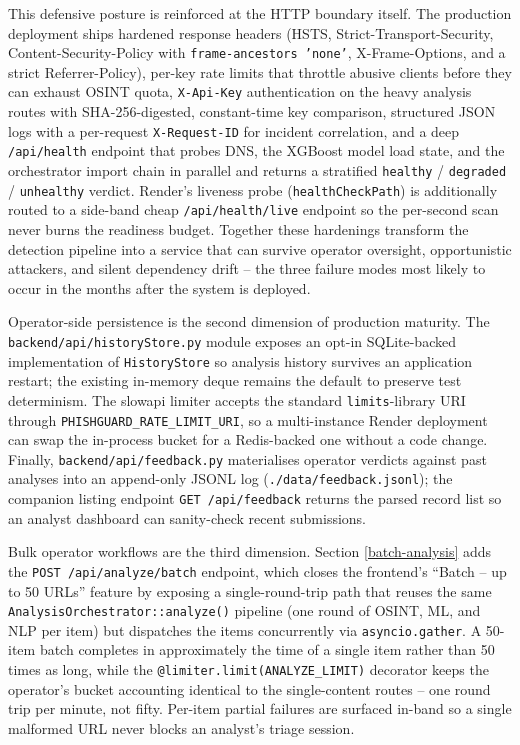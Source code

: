 This defensive posture is reinforced at the HTTP boundary itself. The
production deployment ships hardened response headers (HSTS,
Strict-Transport-Security, Content-Security-Policy with
\texttt{frame-ancestors\ 'none'}, X-Frame-Options, and a strict
Referrer-Policy), per-key rate limits that throttle abusive clients
before they can exhaust OSINT quota, \texttt{X-Api-Key} authentication
on the heavy analysis routes with SHA-256-digested, constant-time
key comparison, structured JSON logs with a per-request
\texttt{X-Request-ID} for incident correlation, and a deep
\texttt{/api/health} endpoint that probes DNS, the XGBoost model
load state, and the orchestrator import chain in parallel and
returns a stratified \texttt{healthy} / \texttt{degraded} /
\texttt{unhealthy} verdict. Render's liveness probe
(\texttt{healthCheckPath}) is additionally routed to a side-band cheap
\texttt{/api/health/live} endpoint so the per-second scan never burns
the readiness budget. Together these hardenings transform the
detection pipeline into a service that can survive operator
oversight, opportunistic attackers, and silent dependency drift --
the three failure modes most likely to occur in the months after
the system is deployed.

Operator-side persistence is the second dimension of production
maturity.  The \texttt{backend/api/historyStore.py} module exposes
an opt-in SQLite-backed implementation of \texttt{HistoryStore} so
analysis history survives an application restart; the existing
in-memory deque remains the default to preserve test determinism.
The slowapi limiter accepts the standard \texttt{limits}-library
URI through \texttt{PHISHGUARD\_RATE\_LIMIT\_URI}, so a
multi-instance Render deployment can swap the in-process bucket for
a Redis-backed one without a code change.  Finally,
\texttt{backend/api/feedback.py} materialises operator verdicts
against past analyses into an append-only JSONL log
(\texttt{./data/feedback.jsonl}); the companion listing endpoint
\texttt{GET /api/feedback} returns the parsed record list so an
analyst dashboard can sanity-check recent submissions.

Bulk operator workflows are the third dimension.  Section
\ref{batch-analysis} adds the \texttt{POST /api/analyze/batch}
endpoint, which closes the frontend's ``Batch -- up to 50 URLs''
feature by exposing a single-round-trip path that reuses the same
\texttt{AnalysisOrchestrator::analyze()} pipeline (one round of
OSINT, ML, and NLP per item) but dispatches the items concurrently
via \texttt{asyncio.gather}.  A 50-item batch completes in
approximately the time of a single item rather than 50 times as
long, while the \texttt{@limiter.limit(ANALYZE\_LIMIT)} decorator
keeps the operator's bucket accounting identical to the
single-content routes -- one round trip per minute, not fifty.
Per-item partial failures are surfaced in-band so a single
malformed URL never blocks an analyst's triage session.


